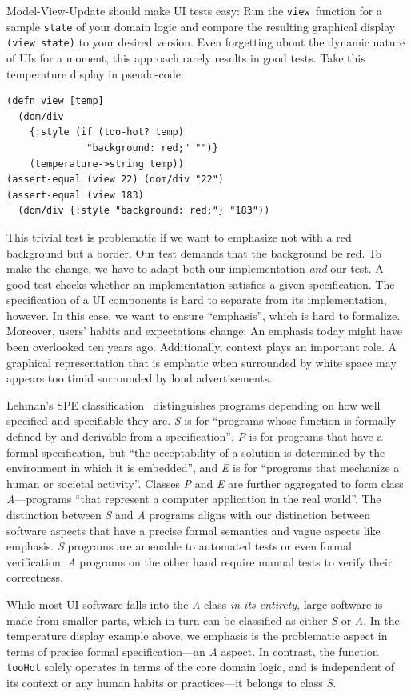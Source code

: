 \documentclass[sigplan,screen]{acmart}
\begin{document}
Model-View-Update should make UI tests easy: Run the
\texttt{view }function for a sample \texttt{state} of
your domain logic and compare the resulting graphical display
\texttt{(view state)} to your desired version. Even forgetting about
the dynamic nature of UIs for a moment, this approach rarely results
in good tests. Take this temperature display in pseudo-code:
%
\begin{verbatim}
(defn view [temp]
  (dom/div
    {:style (if (too-hot? temp)
              "background: red;" "")}
    (temperature->string temp))
(assert-equal (view 22) (dom/div "22")
(assert-equal (view 183)
  (dom/div {:style "background: red;"} "183"))
\end{verbatim}
%
This trivial test is problematic if we want to emphasize
not with a red background but a border.  Our test
demands that the background be red. To make the change,
we have to adapt both our implementation \textit{and} our
test.
A good
test checks whether an implementation satisfies a given specification.
The specification of a
UI components is hard to separate from its implementation,
however. In this case, we want to ensure ``emphasis'', which 
is hard to formalize. Moreover, users' habits and expectations
change: An emphasis today might have been overlooked ten years ago. Additionally,
context plays an important role. A graphical representation that is
emphatic when surrounded by white space may appears too timid
surrounded by loud advertisements.

Lehman's SPE classification~\cite{SPE} distinguishes programs
depending on how well specified and specifiable they are.
\textit{S} is for ``programs whose function is formally defined by and
derivable from a specification'', \textit{P} is for programs that have
a formal specification, but ``the acceptability of a solution is
determined by the environment in which it is embedded'', and
\textit{E} is for ``programs that mechanize a human or societal
activity''. Classes \textit{P} and \textit{E} are further aggregated
to form class \textit{A}---programs ``that represent a computer
application in the real world''. The distinction between \textit{S}
and \textit{A} programs aligns with our distinction between software
aspects that have a precise formal semantics and vague aspects like
emphasis. \textit{S} programs are amenable to automated tests
or even formal verification. \textit{A} programs on the other hand require manual tests to
verify their correctness.

While most UI software falls into the \textit{A} class \textit{in its
  entirety}, large software is made from smaller parts, which in turn
can be classified as either \textit{S} or \textit{A}. In the
temperature display example above, we
emphasis is the problematic aspect in terms of precise formal
specification---an \textit{A} aspect. In contrast, the function
\texttt{tooHot} solely operates in terms of the core domain
logic, and is independent of its context or any human habits
or practices---it belongs to class \textit{S}.
\end{document}
